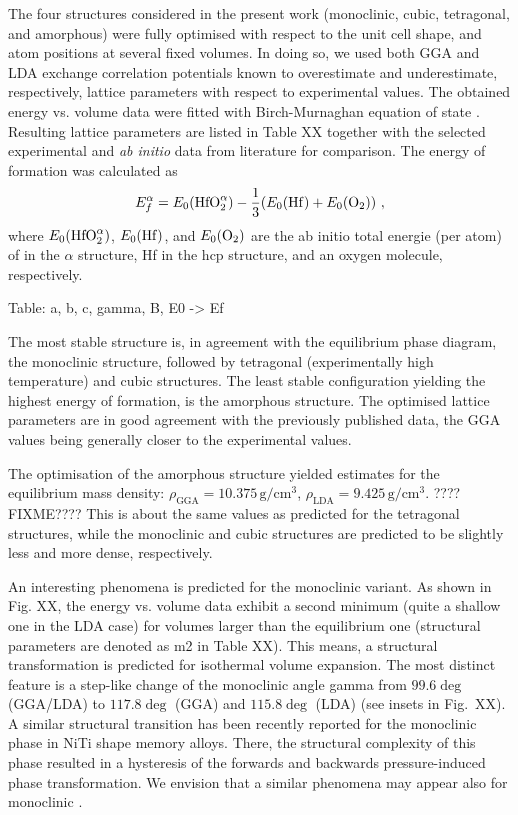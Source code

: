 \documentclass[10pt,a4paper,twocolumn]{article}
\begin{document}
The four structures considered in the present work (monoclinic, cubic, tetragonal, and amorphous) were fully optimised with respect to the unit cell shape, and atom positions at several fixed volumes.
In doing so, we used both GGA and LDA exchange correlation potentials known to overestimate and underestimate, respectively, lattice parameters with respect to experimental values.
The obtained energy vs. volume data were fitted with Birch-Murnaghan equation of state \cite{Birch1947}.
Resulting lattice parameters are listed in Table XX together with the selected experimental and \textit{ab initio} data from literature for comparison.
The energy of formation was calculated as
\begin{equation}
  E_f^\alpha=E_0(\ce{HfO2}^\alpha) - \frac13 (E_0(\ce{Hf}) + E_0(\ce{O2}))\ ,
\end{equation}
where $E_0(\ce{HfO2}^\alpha)$, $E_0(\ce{Hf})$, and $E_0(\ce{O2})$ are the ab initio total energie (per atom) of  in the $\alpha$ structure, Hf in the hcp structure, and an oxygen molecule, respectively.

Table: a, b, c, gamma, B, E0 -> Ef

The most stable structure is, in agreement with the equilibrium phase diagram, the monoclinic structure, followed by tetragonal (experimentally high temperature) and cubic structures.
The least stable configuration yielding the highest energy of formation, is the amorphous structure.
The optimised lattice parameters are in good agreement with the previously published data, the GGA values being generally closer to the experimental values.

The optimisation of the amorphous structure yielded estimates for the equilibrium mass density: $\rho_{\mathrm{GGA}}=10.375\,\mathrm{g/cm^3}$, $\rho_{\mathrm{LDA}}=9.425\,\mathrm{g/cm^3}$. ????FIXME????
This is about the same values as predicted for the tetragonal structures, while the monoclinic and cubic structures are predicted to be slightly less and more dense, respectively.

An interesting phenomena is predicted for the monoclinic variant.
As shown in Fig. XX, the energy vs. volume data exhibit a second minimum (quite a shallow one in the LDA case) for volumes larger than the equilibrium one (structural parameters are denoted as m2 in Table XX).
This means, a structural transformation is predicted for isothermal volume expansion.
The most distinct feature is a step-like change of the monoclinic angle gamma from $99.6\deg$ (GGA/LDA) to $117.8\deg$ (GGA) and $115.8\deg$ (LDA) (see insets in Fig.~XX).
A similar structural transition has been recently reported for the monoclinic phase in NiTi shape memory alloys.
There, the structural complexity of this phase resulted in a hysteresis of the forwards and backwards pressure-induced phase transformation.
We envision that a similar phenomena may appear also for monoclinic .
\end{document}
